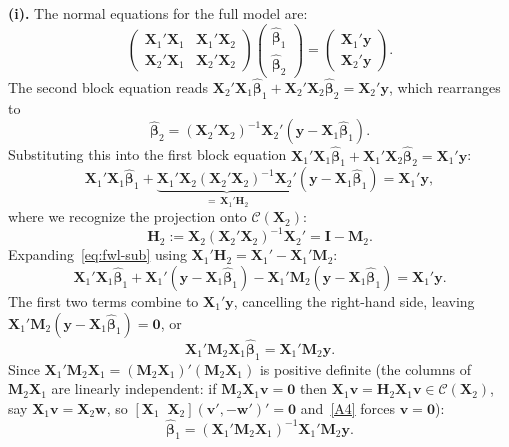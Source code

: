 \documentclass[12pt,a4paper]{article}
\makeatletter
\theoremstyle{definition}
\renewenvironment{proof}[1][\proofname]{\par
  \pushQED{\qed}%
  \normalfont \topsep6\p@\@plus6\p@\relax
  \trivlist
  \item[\hskip\labelsep\bfseries #1\@addpunct{.}]\ignorespaces
}{%
  \popQED\endtrivlist\@endpefalse
}
\newcommand{\bX}{\mathbf{X}}
\newcommand{\by}{\mathbf{y}}
\def\bb{\boldsymbol{\beta}}
\newcommand{\bI}{\mathbf{I}}
\newcommand{\bH}{\mathbf{H}}
\newcommand{\bM}{\mathbf{M}}
\newcommand{\bzero}{\mathbf{0}}
\newcommand{\bw}{\mathbf{w}}
\newcommand{\bv}{\mathbf{v}}
\newcommand{\calC}{\mathcal{C}}
\makeatother
\begin{document}
\begin{proof}
\textbf{(i).} The normal equations for the full model are:
\[
\begin{pmatrix} \bX_1'\bX_1 & \bX_1'\bX_2 \\ \bX_2'\bX_1 & \bX_2'\bX_2 \end{pmatrix} \begin{pmatrix} \hat{\bb}_1 \\ \hat{\bb}_2 \end{pmatrix} = \begin{pmatrix} \bX_1'\by \\ \bX_2'\by \end{pmatrix}.
\]
The second block equation reads $\bX_2'\bX_1\hat{\bb}_1 + \bX_2'\bX_2\hat{\bb}_2 = \bX_2'\by$, which rearranges to
\[
\hat{\bb}_2 = (\bX_2'\bX_2)^{-1}\bX_2'(\by - \bX_1\hat{\bb}_1).
\]
Substituting this into the first block equation $\bX_1'\bX_1\hat{\bb}_1 + \bX_1'\bX_2\hat{\bb}_2 = \bX_1'\by$:
\begin{equation}\label{eq:fwl-sub}
\bX_1'\bX_1\hat{\bb}_1 + \underbrace{\bX_1'\bX_2(\bX_2'\bX_2)^{-1}\bX_2'}_{=\,\bX_1'\bH_2}(\by - \bX_1\hat{\bb}_1) = \bX_1'\by,
\end{equation}
where we recognize the projection onto $\calC(\bX_2)$:
\[
\bH_2 := \bX_2(\bX_2'\bX_2)^{-1}\bX_2' = \bI - \bM_2.
\]
Expanding~\eqref{eq:fwl-sub} using $\bX_1'\bH_2 = \bX_1' - \bX_1'\bM_2$:
\[
\bX_1'\bX_1\hat{\bb}_1 + \bX_1'(\by - \bX_1\hat{\bb}_1) - \bX_1'\bM_2(\by - \bX_1\hat{\bb}_1) = \bX_1'\by.
\]
The first two terms combine to $\bX_1'\by$, cancelling the right-hand side, leaving $\bX_1'\bM_2(\by - \bX_1\hat{\bb}_1) = \bzero$, or
\[
\bX_1'\bM_2\bX_1\hat{\bb}_1 = \bX_1'\bM_2\by.
\]
Since $\bX_1'\bM_2\bX_1 = (\bM_2\bX_1)'(\bM_2\bX_1)$ is positive definite (the columns of $\bM_2\bX_1$ are linearly independent: if $\bM_2\bX_1\bv = \bzero$ then $\bX_1\bv = \bH_2\bX_1\bv \in \calC(\bX_2)$, say $\bX_1\bv = \bX_2\bw$, so $[\bX_1 \;\; \bX_2](\bv', -\bw')' = \bzero$ and~\ref{A4} forces $\bv = \bzero$):
\[
\hat{\bb}_1 = (\bX_1'\bM_2\bX_1)^{-1}\bX_1'\bM_2\by.
\]


\end{proof}
\end{document}
